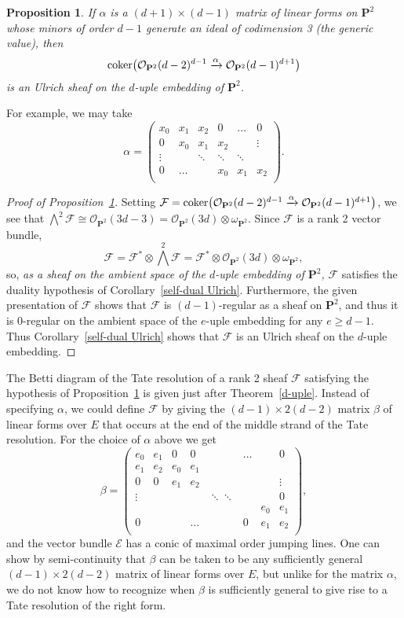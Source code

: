 \documentclass{jams-l}
\newtheorem{proposition}[theorem]{Proposition}
\theoremstyle{definition}
\theoremstyle{remark}
\newcommand{\cE} {{\mathcal E}}
\newcommand{\F}{{\mathcal F}}
\newcommand{\Ocal}{{\mathcal O}}
\newcommand{\PP}{{\mathbf P}}
\newcommand{\coker}{\mathop{\rm coker}}
\newcommand{\iso}{\cong}
\newcommand{\rTo}{\xrightarrow}
\begin{document}
\begin{proposition}\label{rank 2 on P2} If $\alpha$ is
a $(d+1)\times (d-1)$ matrix of linear forms on $\PP^2$ 
whose minors of order $d-1$ generate an ideal of codimension 3
(the generic value), then
\[
\coker \bigl(\Ocal_{\PP^2}(d-2)^{d-1}\rTo{\alpha} \Ocal_{\PP^2}(d-1)^{d+1}\bigr)
\]
is an Ulrich sheaf on the $d$-uple embedding of $\PP^2$.
\end{proposition}

For example, we may take
\[
\alpha=\begin{pmatrix}
x_0 & x_1 & x_2 & 0 & \ldots & 0 \\
0 & x_0 & x_1 & x_2 & & \vdots\\
\vdots && \ddots & \ddots & \ddots  \\
0 & \ldots & & x_0 & x_1 & x_2 \\ \end{pmatrix}.
\]

\begin{proof}[Proof of Proposition~\ref{rank 2 on P2}]
Setting
$\F=\coker \bigl(\Ocal_{\PP^2}(d-2)^{d-1}\rTo{\alpha} \Ocal_{\PP^2}(d-1)^{d+1}
\bigr)$,
we see that 
$\bigwedge^2 \F \iso \Ocal_{\PP^2}(3d-3)= \Ocal_{\PP^2}(3d)\otimes \omega_{\PP^2}$.
Since $\F$ is a rank 2 vector bundle, 
\[
\F=\F^*\otimes \bigwedge^2\F 
= \F^*\otimes \Ocal_{\PP^2}(3d)\otimes \omega_{\PP^2},
\]
so, {\it as a sheaf on the ambient space of the $d$-uple
embedding of $\PP^2$,\/} $\F$ satisfies the duality hypothesis
of Corollary~\ref{self-dual Ulrich}. Furthermore, the given
presentation of $\F$ shows that $\F$ is $(d-1)$-regular
as a sheaf on $\PP^2$,
and thus it is 0-regular on the ambient space
of the $e$-uple embedding for any $e\geq d-1$.
Thus Corollary~\ref{self-dual Ulrich} shows that $\F$ is
an Ulrich sheaf on the $d$-uple embedding.
\end{proof}
  
The Betti diagram of the Tate resolution of a rank
2 sheaf $\F$ satisfying the hypothesis of 
Proposition~\ref{rank 2 on P2} 
is given just after 
Theorem~\ref{d-uple}. 
Instead of specifying $\alpha$, we could define
$\F$ by giving the $(d-1) \times 2(d-2)$ 
matrix $\beta$ of linear forms over $E$
that occurs at the end of the middle strand
of the Tate resolution. For the choice of $\alpha$ above
we get 
\[\beta=\begin{pmatrix}
e_0 & e_1 & 0 & 0 && \ldots && 0 \\
e_1 & e_2 & e_0 & e_1 & &  && \\
0 & 0 & e_1 & e_2 & &&& \vdots\\
\vdots &&&&\ddots  \ddots &&& 0 \\
&&&&& &e_0 & e_1 \\
0&&&\ldots&&0& e_1 & e_2 \\ \end{pmatrix},\]
and the vector bundle $\cE$ has a conic of maximal order jumping
lines. One can show by semi-continuity that $\beta$ can be
taken to be any sufficiently general 
$(d-1) \times 2(d-2)$ matrix of linear forms over $E$, but 
unlike for the matrix $\alpha$, we do not know how to recognize
when $\beta$ is sufficiently general to give rise to 
a Tate resolution of the right form.
\end{document}
